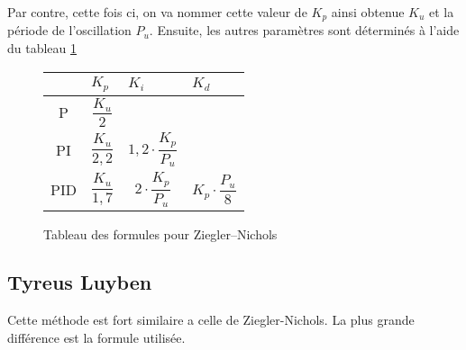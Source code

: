 Par contre, cette fois ci, on va nommer cette valeur de $K_p$ ainsi obtenue $K_u$ et la période de l'oscillation $P_u$.
Ensuite, les autres paramètres sont déterminés à l'aide du tableau \ref{tab:ZieglerNicholsTuningFormulas}

\def\tabularxcolumn#1{m{#1}}
\begin{figure}[ht]
	\begin{center}
		\begin{tabularx}{\textwidth}{| c | X | X | X |}
			\hline
			& $K_p$ & $K_i$ & $K_d$\\ \hline
			P & \begin{equation*}\frac{K_u}{2}\end{equation*} & &\\ \hline
			PI & \begin{equation*}\frac{K_u}{2,2}\end{equation*} & \begin{equation*}1,2 \cdot \frac{K_p}{P_u}\end{equation*} &\\ \hline
			PID & \begin{equation*}\frac{K_u}{1,7}\end{equation*} & \begin{equation*}2 \cdot \frac{K_p}{P_u}\end{equation*} & \begin{equation*}K_p \cdot \frac{P_u}{8}\end{equation*} \\
			\hline
		\end{tabularx}
	\end{center}
	\caption{Tableau des formules pour Ziegler–Nichols}
	\label{tab:ZieglerNicholsTuningFormulas}
\end{figure}

\subsection{Tyreus Luyben}
Cette méthode est fort similaire a celle de Ziegler-Nichols. La plus grande différence est la formule utilisée.\cite{shahrokhi2013comparison}

